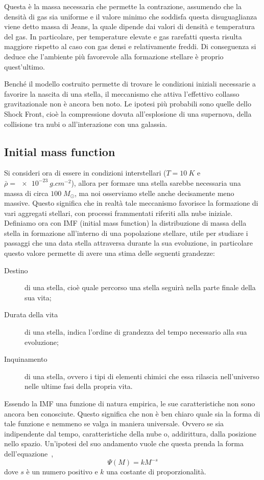 Questa è la massa necessaria che permette la contrazione, assumendo che la densità di gas sia uniforme e il valore minimo che soddisfa questa disuguaglianza viene detto massa di Jeans, la quale dipende dai valori di densità e temperatura del gas. In particolare, per temperature elevate e gas rarefatti questa risulta maggiore rispetto al caso con gas densi e relativamente freddi. Di conseguenza si deduce che l'ambiente più favorevole alla formazione stellare è proprio quest'ultimo.

Benché il modello costruito permette di trovare le condizioni iniziali necessarie a favorire la nascita di una stella, il meccanismo che attiva l'effettivo collasso gravitazionale non è ancora ben noto. Le ipotesi più probabili sono quelle dello Shock Front, cioè la compressione dovuta all'esplosione di una supernova, della collisione tra nubi o all'interazione con una galassia.
\subsection{Initial mass function}
Si consideri ora di essere in condizioni interstellari ($T = \SI{10}{K}$ e $ \bar \rho = \SI{e-23}{g.cm^{-2}} $), allora per formare una stella sarebbe necessaria una massa di circa $100 \;M_\odot $, ma noi osserviamo stelle anche decisamente meno massive. Questo significa che in realtà tale meccanismo favorisce la formazione di vari aggregati stellari, con processi frammentati riferiti alla nube iniziale. Definiamo ora con IMF (initial mass function) la distribuzione di massa della stella in formazione all'interno di una popolazione stellare, utile per studiare i passaggi che una data stella attraversa durante la sua evoluzione, in particolare questo valore permette di avere una stima delle seguenti grandezze:
\begin{description}
    \item[Destino]di una stella, cioè quale percorso una stella seguirà nella parte finale della sua vita;
    \item[Durata della vita]di una stella, indica l'ordine di grandezza del tempo necessario alla sua evoluzione;
    \item[Inquinamento]di una stella, ovvero i tipi di elementi chimici che essa rilascia nell'universo nelle ultime fasi della propria vita.
\end{description}

Essendo la IMF una funzione di natura empirica, le sue caratteristiche non sono ancora ben conosciute. Questo significa che non è ben chiaro quale sia la forma di tale funzione e nemmeno se valga in maniera universale. Ovvero se sia indipendente dal tempo, caratteristiche della nube o, addirittura, dalla posizione nello spazio. Un'ipotesi del suo andamento vuole che questa prenda la forma dell'equazione~,
\begin{equation}
    \Psi(M) = k M^{-s}
    \label{eq:IMF}
\end{equation}
dove $s$ è un numero positivo e $k$ una costante di proporzionalità.

